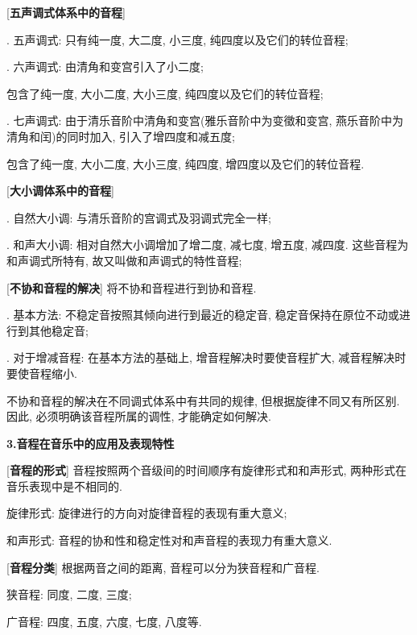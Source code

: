 [\textbf{五声调式体系中的音程}] \par
{}. 五声调式: 只有纯一度, 大二度, 小三度, 纯四度以及它们的转位音程;\par
{}. 六声调式: 由清角和变宫引入了小二度;\par
\qquad \qquad 包含了纯一度, 大小二度, 大小三度, 纯四度以及它们的转位音程;\par
{}. 七声调式: 由于清乐音阶中清角和变宫(雅乐音阶中为变徵和变宫, 燕乐音阶中为清角和闰)的同时加入, 引入了增四度和减五度;\par
\qquad \qquad 包含了纯一度, 大小二度, 大小三度, 纯四度, 增四度以及它们的转位音程.\par

[\textbf{大小调体系中的音程}] \par
{}. 自然大小调: 与清乐音阶的宫调式及羽调式完全一样;\par
{}. 和声大小调: 相对自然大小调增加了增二度, 减七度, 增五度, 减四度. 这些音程为和声调式所特有, 故又叫做和声调式的特性音程;\par

[\textbf{不协和音程的解决}] 将不协和音程进行到协和音程.\par
{}. 基本方法: 不稳定音按照其倾向进行到最近的稳定音, 稳定音保持在原位不动或进行到其他稳定音;\par
{}. 对于增减音程: 在基本方法的基础上, 增音程解决时要使音程扩大, 减音程解决时要使音程缩小.\par
\qquad 不协和音程的解决在不同调式体系中有共同的规律, 但根据旋律不同又有所区别. 因此, 必须明确该音程所属的调性, 才能确定如何解决.\par

\begin{center}
 \textbf{3.音程在音乐中的应用及表现特性}\\
\end{center}

[\textbf{音程的形式}] 音程按照两个音级间的时间顺序有旋律形式和和声形式, 两种形式在音乐表现中是不相同的.\par
\qquad 旋律形式: 旋律进行的方向对旋律音程的表现有重大意义;\par
\qquad 和声形式: 音程的协和性和稳定性对和声音程的表现力有重大意义.\par

[\textbf{音程分类}] 根据两音之间的距离, 音程可以分为狭音程和广音程.\par
\qquad 狭音程: 同度, 二度, 三度;\par
\qquad 广音程: 四度, 五度, 六度, 七度, 八度等.\par

